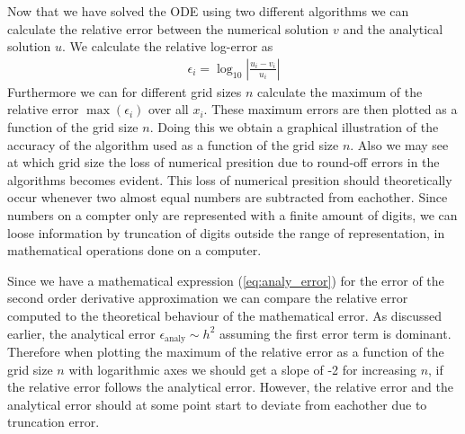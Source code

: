 \documentclass[twocolumn]{aastex62}
\begin{document}
Now that we have solved the ODE using two different algorithms we can calculate the relative error between the numerical solution $v$ and the analytical solution $u$. We calculate the relative log-error as 
\begin{align}
	\epsilon_i = \log_{10} \left|\frac{u_i - v_i}{u_i}\right|
	\label{eq:rel_error}
\end{align}
Furthermore we can for different grid sizes $n$ calculate the maximum of the relative error $\max(\epsilon_i)$ over all $x_i$. These maximum errors are then plotted as a function of the grid size $n$. Doing this we obtain a graphical illustration of the accuracy of the algorithm used as a function of the grid size $n$. Also we may see at which grid size the loss of numerical presition due to round-off errors in the algorithms becomes evident. This loss of numerical presition should theoretically occur whenever two almost equal numbers are subtracted from eachother. Since numbers on a compter only are represented with a finite amount of digits, we can loose information by truncation of digits outside the range of representation, in mathematical operations done on a computer.

Since we have a mathematical expression (\ref{eq:analy_error}) for the error of the second order derivative approximation we can compare the relative error computed to the theoretical behaviour of the mathematical error. As discussed earlier, the analytical error $\epsilon_\text{analy} \sim h^2$ assuming the first error term is dominant. Therefore when plotting the maximum of the relative error as a function of the grid size $n$ with logarithmic axes we should get a slope of -2 for increasing $n$, if the relative error follows the analytical error. However, the relative error and the analytical error should at some point start to deviate from eachother due to truncation error. 
\end{document}
